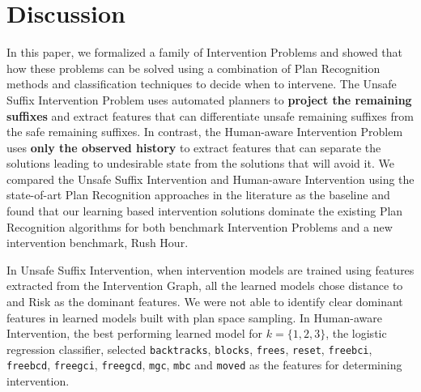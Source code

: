 \section{Discussion}
\label{sec:discussion}
In this paper, we formalized a family of Intervention Problems and showed that how these problems can be solved using a combination of Plan Recognition methods and classification techniques to decide when to intervene.
The Unsafe Suffix Intervention Problem uses automated planners to \textbf{project the remaining suffixes} and extract features that can differentiate unsafe remaining suffixes from the safe remaining suffixes. 
In contrast, the Human-aware Intervention Problem uses \textbf{only the observed history \historyDef} to extract features that can separate the solutions leading to undesirable state from the solutions that will avoid it.
We compared the Unsafe Suffix Intervention and Human-aware Intervention using the state-of-art Plan Recognition approaches in the literature as the baseline and found that our learning based intervention solutions dominate the existing Plan Recognition algorithms for both benchmark Intervention Problems and a new intervention benchmark, Rush Hour.

In Unsafe Suffix Intervention, when intervention models are trained using features extracted from the Intervention Graph, all the learned models chose distance to \undesired and Risk as the dominant features. We were not able to identify clear dominant features in learned models built with plan space sampling. 
In Human-aware Intervention, the best performing learned model for $k=\lbrace 1,2,3\rbrace$, the logistic regression classifier, selected  \texttt{backtracks}, \texttt{blocks}, \texttt{frees}, \texttt{reset}, \texttt{freebci}, \texttt{freebcd}, \texttt{freegci}, \texttt{freegcd}, \texttt{mgc}, \texttt{mbc} and \texttt{moved} as the features for determining intervention.


